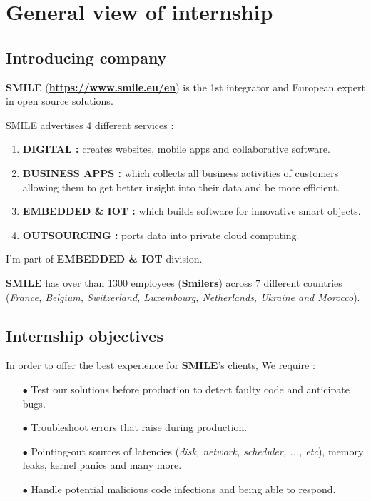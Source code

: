 \section{General view of internship}

\subsection{Introducing company}
\textbf{SMILE} (\textbf{\color{blue}\url{https://www.smile.eu/en}}) is the 1st integrator and European expert in open source solutions. 

SMILE advertises 4 different services :
\begin{enumerate}
	\item \textbf{DIGITAL : } creates websites, mobile apps and collaborative software. 
	\item \textbf{BUSINESS APPS : } which collects all business activities of customers allowing them to get better insight into their data and be more efficient. 
	\item \textbf{EMBEDDED \& IOT : } which builds software for innovative smart objects.
	\item \textbf{OUTSOURCING : } ports data into private cloud computing. 
\end{enumerate}


\begin{center} \color{red}
I'm part of \textbf{EMBEDDED \& IOT} division.
\end{center}

\textbf{SMILE} has over than 1300 employees (\textbf{Smilers}) across 7 different countries (\textit{France, Belgium, Switzerland, Luxembourg, Netherlands, Ukraine and Morocco}).

\subsection{Internship objectives}
In order to offer the best experience for \textbf{SMILE}'s clients, We require :

\begin{itemize}
\item[$\bullet$] Test our solutions before production to detect faulty code and anticipate bugs.
\item[$\bullet$] Troubleshoot errors that raise during production. 
\item[$\bullet$] Pointing-out sources of latencies (\emph{disk, network, scheduler, ..., etc}), memory leaks, kernel panics and many more.
\item[$\bullet$] Handle potential malicious code infections and being able to respond.
\end{itemize}

